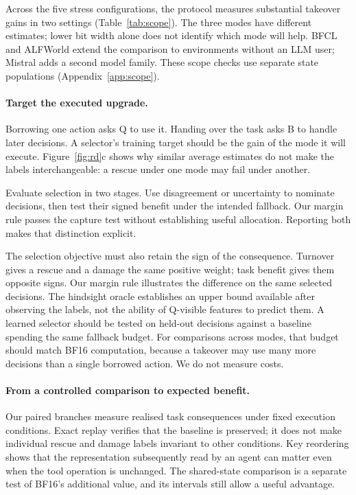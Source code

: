 Across the five stress configurations, the protocol measures substantial takeover gains in two settings (Table~\ref{tab:scope}). The three modes have different estimates; lower bit width alone does not identify which mode will help. BFCL and ALFWorld extend the comparison to environments without an LLM user; Mistral adds a second model family. These scope checks use separate state populations (Appendix~\ref{app:scope}).

\paragraph{Target the executed upgrade.} Borrowing one action asks Q to use it. Handing over the task asks B to handle later decisions. A selector's training target should be the gain of the mode it will execute. Figure~\ref{fig:rd}c shows why similar average estimates do not make the labels interchangeable: a rescue under one mode may fail under another.

Evaluate selection in two stages. Use disagreement or uncertainty to nominate decisions, then test their signed benefit under the intended fallback. Our margin rule passes the capture test without establishing useful allocation. Reporting both makes that distinction explicit.

The selection objective must also retain the sign of the consequence. Turnover gives a rescue and a damage the same positive weight; task benefit gives them opposite signs. Our margin rule illustrates the difference on the same selected decisions. The hindsight oracle establishes an upper bound available after observing the labels, not the ability of Q-visible features to predict them. A learned selector should be tested on held-out decisions against a baseline spending the same fallback budget. For comparisons across modes, that budget should match BF16 computation, because a takeover may use many more decisions than a single borrowed action. We do not measure costs.

\paragraph{From a controlled comparison to expected benefit.} Our paired branches measure realised task consequences under fixed execution conditions. Exact replay verifies that the baseline is preserved; it does not make individual rescue and damage labels invariant to other conditions. Key reordering shows that the representation subsequently read by an agent can matter even when the tool operation is unchanged. The shared-state comparison is a separate test of BF16's additional value, and its intervals still allow a useful advantage.

